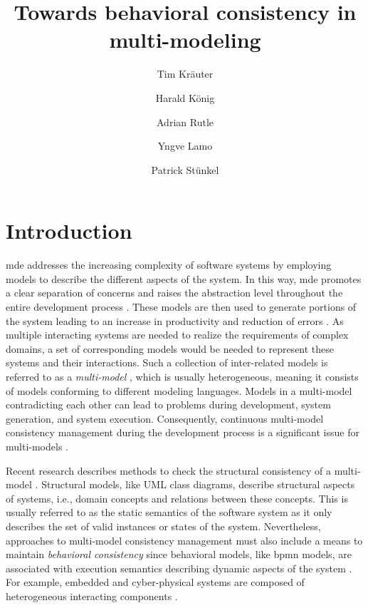 \documentclass{jot}
\title{Towards behavioral consistency in multi-modeling}
\author[$\ast$]{Tim Kräuter}
\author[$\ast\dagger$]{Harald König}
\author[$\ast$]{Adrian Rutle}
\author[$\ast$]{Yngve Lamo}
\author[$\ddagger$]{Patrick Stünkel}
\affil[$\ast$]{Western Norway University of Applied Sciences, Bergen, Norway}
\affil[$\dagger$]{University of Applied Sciences, FHDW, Hannover, Germany}
\affil[$\ddagger$]{Haukeland Universitetssykehus, Bergen, Norway}
\begin{document}
    
\maketitle
{}


\section{Introduction} \label{sec:introduction}
\gls*{mde} addresses the increasing complexity of software systems by employing models to describe the different aspects of the system.
In this way, \gls*{mde} promotes a clear separation of concerns and raises the abstraction level throughout the entire development process \cite{franceModeldrivenDevelopmentComplex2007}.
These models are then used to generate portions of the system leading to an increase in productivity and reduction of errors \cite{brambillaModeldrivenSoftwareEngineering2017}.
As multiple interacting systems are needed to realize the requirements of complex domains, a set of corresponding models would be needed to represent these systems and their interactions.
Such a collection of inter-related models is referred to as a \emph{multi-model} \cite{boronatWhatMultimodelingLanguage2009, stunkelComprehensiveSystemsFormal2021}, which is usually heterogeneous, meaning it consists of models conforming to different modeling languages.
Models in a multi-model contradicting each other can lead to problems during development, system generation, and system execution.
Consequently, continuous multi-model consistency management during the development process is a significant issue for multi-models \cite{spanoudakisInconsistencyManagementSoftware2001, cicchettiMultiviewApproachesSoftware2019}.

Recent research describes methods to check the structural consistency of a multi-model \cite{stunkelComprehensiveSystemsFormal2021, klareCommonalitiesPreservingConsistency2019}.
Structural models, like UML class diagrams, describe structural aspects of systems, i.e., domain concepts and relations between these concepts.
This is usually referred to as the static semantics of the software system as it only describes the set of valid instances or states of the system.
Nevertheless, approaches to multi-model consistency management must also include a means to maintain \emph{behavioral consistency} since behavioral models, like \gls*{bpmn} models, are associated with execution semantics describing dynamic aspects of the system \cite{objectmanagementgroupUnifiedModelingLanguage2017, objectmanagementgroupBusinessProcessModel2013}.
For example, embedded and cyber-physical systems are composed of heterogeneous interacting components \cite{varalarsenBehavioralCoordinationOperator2015}.
\end{document}
